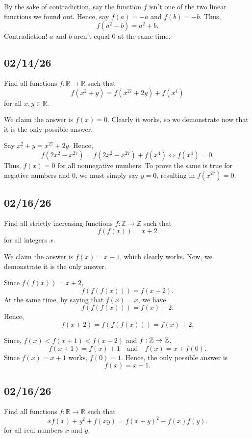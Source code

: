 \documentclass[12pt]{article}
\begin{document}
By the sake of contradiction, say the function $f$ isn't one of the two linear functions we found out. Hence, say
$f(a)=+a$ and $f(b)=-b$. Thus,
\[
	f(a^2-b)=a^2+b.
\]
Contradiction! $a$ and $b$ aren't equal 0 at the same time.

\clearpage

\subsection{02/14/26}
\begin{problem}
Find all functions $f:\mathbb{R}\to\mathbb{R}$ such that
\[
	f(x^{2}+y)=f(x^{27}+2y)+f(x^{4})
\]
for all $x,y\in\mathbb{R}$.
\end{problem}
We claim the answer is $f(x)=0$. Clearly it works, so we demonstrate now that it is the only possible answer.

Say $x^2+y=x^{27}+2y$. Hence,
\[
	f(2x^2-x^{27})=f(2x^2-x^{27})+f(x^4) \iff f(x^4)=0.
\]
Thus, $f(x)=0$ for all nonnegative numbers. To prove the same is true for negative numbers and $0$,
we must simply say $y=0$, resulting in $f(x^{27})=0$.

\clearpage

\subsection{02/16/26}
\begin{problem}
Find all strictly increasing functions $f:\mathbb{Z}\to\mathbb{Z}$ such that
\[
	f(f(x))=x+2
\]
for all integers $x$.
\end{problem}
We claim the answer is $f(x)=x+1$, which clearly works. Now, we demonstrate it is the only answer.

Since $f(f(x))=x+2$,
\[
	f(f(f(x)))=f(x+2).
\]
At the same time, by saying that $f(x)=x$, we have
\[
	f(f(f(x)))=f(x)+2.
\]
Hence,
\[
	f(x+2)=f(f(f(x)))=f(x)+2.
\]

Since, $f(x)<f(x+1)<f(x+2)$ and $f: \mathbb{Z} \to \mathbb{Z}$,
\[
	f(x+1)=f(x)+1 \quad \text{and} \quad f(x)=x+f(0).
\]
Since $f(x)=x+1$ works, $f(0)=1$. Hence, the only possible answer is
\[
	f(x)=x+1.
\]

\clearpage

\subsection{02/16/26}
\begin{problem}
Find all functions $f:\mathbb{R}\to\mathbb{R}$ such that
\[
	x f(x) + y^{2} + f(xy) = f(x+y)^{2} - f(x)f(y).
\]
for all real numbers $x$ and $y$.
\end{problem}
\end{document}
